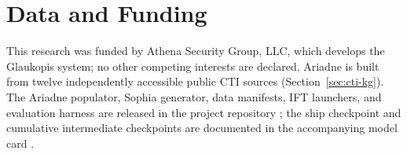 \documentclass[conference]{IEEEtran}
\begin{document}
\section*{Data and Funding}
This research was funded by Athena Security Group, LLC, which develops the Glaukopis system; no other competing interests are declared. Ariadne is built from twelve independently accessible public CTI sources (Section~\ref{sec:cti-kg}). The Ariadne populator, Sophia generator, data manifests, IFT launchers, and evaluation harness are released in the project repository \cite{glaukopis2026repo}; the ship checkpoint and cumulative intermediate checkpoints are documented in the accompanying model card \cite{glaukopis2026model}.



\end{document}
